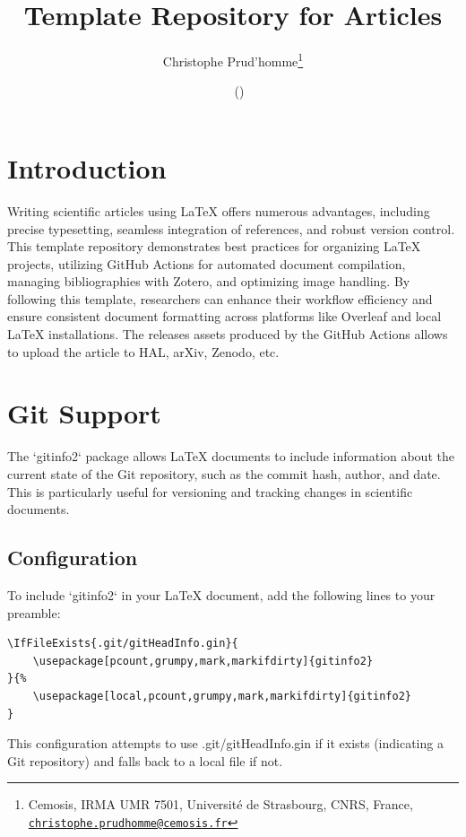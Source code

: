 \documentclass[a4paper]{article}
\title{Template Repository for Articles}
\author{Christophe Prud'homme\thanks{Cemosis, IRMA UMR 7501, Université de Strasbourg, CNRS, France, \tt \href{mailto:christophe.prudhomme@cemosis.fr}{christophe.prudhomme@cemosis.fr}}}
\date{\gitReln\  \gitAuthorDate\ (\gitAbbrevHash)}
\begin{document}
\maketitle
\tableofcontents

\section{Introduction}
\label{sec:introduction}

Writing scientific articles using LaTeX offers numerous advantages, including precise typesetting, seamless integration of references, and robust version control. 
This template repository demonstrates best practices for organizing LaTeX projects, utilizing GitHub Actions for automated document compilation, managing bibliographies with Zotero, and optimizing image handling. 
By following this template, researchers can enhance their workflow efficiency and ensure consistent document formatting across platforms like Overleaf and local LaTeX installations.
The releases assets produced by the GitHub Actions allows to upload the article to HAL, arXiv, Zenodo, etc.



\section{Git Support}
\label{sec:git-support}

The `gitinfo2` package allows LaTeX documents to include information about the current state of the Git repository, such as the commit hash, author, and date. This is particularly useful for versioning and tracking changes in scientific documents.

\subsection{Configuration}

To include `gitinfo2` in your LaTeX document, add the following lines to your preamble:

\begin{verbatim}
\IfFileExists{.git/gitHeadInfo.gin}{
    \usepackage[pcount,grumpy,mark,markifdirty]{gitinfo2}
}{%
    \usepackage[local,pcount,grumpy,mark,markifdirty]{gitinfo2}
}
\end{verbatim}

This configuration attempts to use .git/gitHeadInfo.gin if it exists (indicating a Git repository) and falls back to a local file if not.
\end{document}

